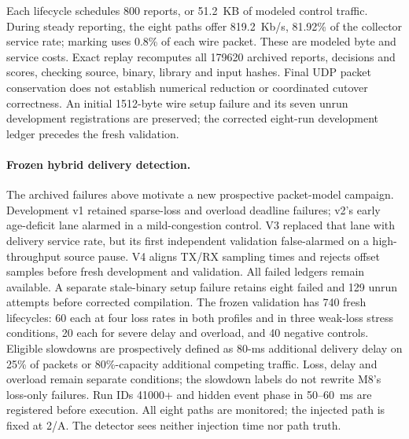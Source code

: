 \documentclass[sigconf]{acmart}
\begin{document}
Each lifecycle schedules 800 reports, or 51.2~KB of modeled control
traffic. During steady reporting, the eight paths offer 819.2~Kb/s,
81.92\% of the collector service rate; marking uses 0.8\% of each
wire packet. These are modeled byte and service costs. Exact replay
recomputes all 179620 archived reports, decisions and scores,
checking source, binary, library and input hashes. Final UDP packet
conservation does not establish numerical reduction or coordinated
cutover correctness. An initial 1512-byte wire setup failure and its
seven unrun development registrations are preserved; the corrected
eight-run development ledger precedes the fresh validation.

\paragraph{Frozen hybrid delivery detection.}
The archived failures above motivate a new prospective packet-model
campaign. Development v1 retained sparse-loss and overload deadline
failures; v2's early age-deficit lane alarmed in a mild-congestion control.
V3 replaced that lane with delivery service rate, but its first independent
validation false-alarmed on a high-throughput source pause. V4 aligns TX/RX
sampling times and rejects offset samples before fresh development and
validation. All failed ledgers remain available. A separate stale-binary setup
failure retains eight failed and 129 unrun attempts before corrected compilation. The frozen validation has
740 fresh lifecycles: 60 each at four loss rates in both profiles and in
three weak-loss stress conditions, 20 each for severe delay and overload,
and 40 negative controls. Eligible slowdowns are prospectively defined
as 80-ms additional delivery delay on 25\% of packets or 80\%-capacity
additional competing traffic. Loss, delay and overload remain separate
conditions; the slowdown labels do not rewrite M8's loss-only failures.
Run IDs 41000+ and hidden event phase in 50--60~ms are registered before
execution. All eight paths are monitored; the injected path is fixed at
2/A. The detector sees neither injection time nor path truth.
\end{document}
